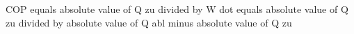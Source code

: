 COP equals absolute value of Q zu divided by W dot equals absolute value of Q zu divided by absolute value of Q abl minus absolute value of Q zu